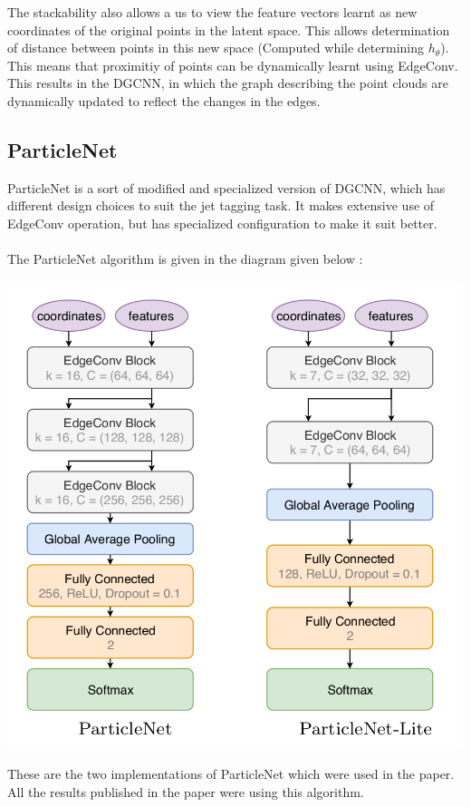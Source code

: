 \noindent The stackability also allows a us to view the feature vectors 
learnt as new coordinates of the original points in the latent space. This allows 
determination of distance between points in this new space (Computed while 
determining $h_\theta$). This means that proximitiy of points can be dynamically 
learnt using EdgeConv. This results in the DGCNN, in which the graph describing 
the point clouds are dynamically updated to reflect the changes in the edges.

\subsection{ParticleNet}
ParticleNet is a sort of modified and specialized version of DGCNN, which has 
different design choices to suit the jet tagging task. It makes extensive 
use of EdgeConv operation, but has specialized configuration to make it 
suit better.
\\\\
The ParticleNet algorithm is given in the diagram given below :

\begin{center}
    \includegraphics[scale=0.25]{img/particle-net.png}
\end{center}

\noindent These are the two implementations of ParticleNet which were used 
in the paper. All the results published in the paper were using this algorithm.